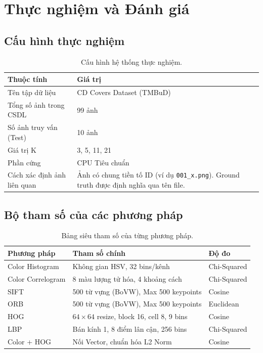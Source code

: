 \chapter{Thực nghiệm và Đánh giá}

\section{Cấu hình thực nghiệm}
\begin{table}[H]
\centering
\begin{tabularx}{\textwidth}{|l|X|}
\hline
\textbf{Thuộc tính} & \textbf{Giá trị} \\
\hline
Tên tập dữ liệu & CD Covers Dataset (TMBuD) \\
\hline
Tổng số ảnh trong CSDL & 99 ảnh \\
\hline
Số ảnh truy vấn (Test) & 10 ảnh \\
\hline
Giá trị K & 3, 5, 11, 21 \\
\hline
Phần cứng & CPU Tiêu chuẩn \\
\hline
Cách xác định ảnh liên quan & Ảnh có chung tiền tố ID (ví dụ \texttt{001\_x.png}). Ground truth được định nghĩa qua tên file. \\
\hline
\end{tabularx}
\caption{Cấu hình hệ thống thực nghiệm.}
\end{table}

\section{Bộ tham số của các phương pháp}
\begin{table}[H]
\centering
\begin{tabularx}{\textwidth}{|l|X|l|}
\hline
\textbf{Phương pháp} & \textbf{Tham số chính} & \textbf{Độ đo} \\
\hline
Color Histogram & Không gian HSV, 32 bins/kênh & Chi-Squared \\
\hline
Color Correlogram & 8 màu lượng tử hóa, 4 khoảng cách & Chi-Squared \\
\hline
SIFT & 500 từ vựng (BoVW), Max 500 keypoints & Cosine \\
\hline
ORB & 500 từ vựng (BoVW), Max 500 keypoints & Euclidean \\
\hline
HOG & $64 \times 64$ resize, block 16, cell 8, 9 bins & Cosine \\
\hline
LBP & Bán kính 1, 8 điểm lân cận, 256 bins & Chi-Squared \\
\hline
Color + HOG & Nối Vector, chuẩn hóa L2 Norm & Cosine \\
\hline
\end{tabularx}
\caption{Bảng siêu tham số của từng phương pháp.}
\end{table}

